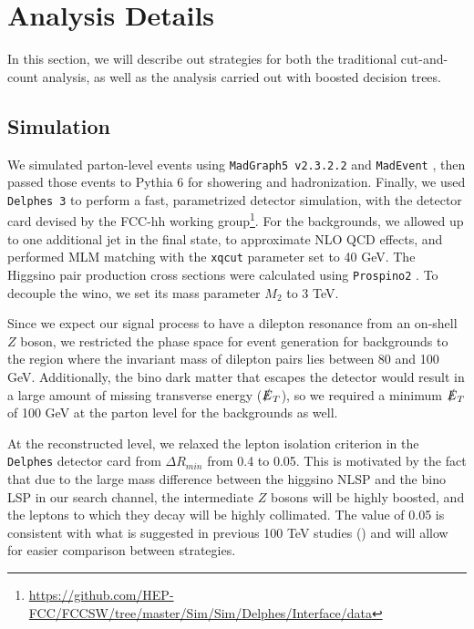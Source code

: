 \section{Analysis Details}\label{sec:analysis}

In this section, we will describe out strategies for both the traditional cut-and-count analysis, as well as the analysis carried out with boosted decision trees. 

\subsection{Simulation}\label{simulation}

We simulated parton-level events using \texttt{MadGraph5 v2.3.2.2} and \texttt{MadEvent} \citep{Alwall2014}, then passed those events to Pythia 6 \citep{Sjostrand2006} for showering and hadronization. Finally, we used \texttt{Delphes 3} \citep{DeFavereau2014a} to perform a fast, parametrized detector simulation, with the detector card devised by the FCC-hh working group\footnote{\url{https://github.com/HEP-FCC/FCCSW/tree/master/Sim/Sim/Delphes/Interface/data}}. For the backgrounds, we allowed up to one additional jet in the final state, to approximate NLO QCD effects, and performed MLM matching with the \texttt{xqcut} parameter set to 40 GeV. The Higgsino pair production cross sections were calculated using \texttt{Prospino2} \citep{Beenakker1999}. To decouple the wino, we set its mass parameter $M_2$ to 3 TeV.

Since we expect our signal process to have a dilepton resonance from an on-shell $Z$ boson, we restricted the phase space for event generation for backgrounds to the region where the invariant mass of dilepton pairs lies between 80 and 100 GeV. Additionally, the bino dark matter that escapes the detector would result in a large amount of missing transverse energy ($\slashed{E}_T$), so we required a minimum $\slashed{E}_T$ of 100 GeV at the parton level for the backgrounds as well. 

At the reconstructed level, we relaxed the lepton isolation criterion in the \texttt{Delphes} detector card from $\Delta R_{min}$ from 0.4 to 0.05. This is motivated by the fact that due to the large mass difference between the higgsino NLSP and the bino LSP in our search channel, the intermediate $Z$ bosons will be highly boosted, and the leptons to which they decay will be highly collimated. The value of 0.05 is consistent with what is suggested in previous 100 TeV studies (\citep{Acharya2014,Gori:2014oua,Bramante2015}) and will allow for easier comparison between strategies.


